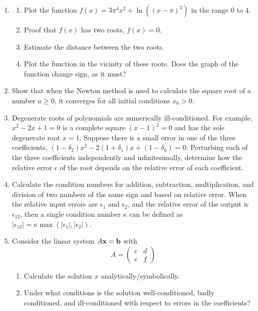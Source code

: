 \documentclass{article}
\begin{document}
\begin{enumerate}
\item \label{prbl:invisibleroot}
\begin{enumerate} \setlength{\itemsep}{0pt}
\item Plot the function  $f(x) = 3 \pi^4 x^2+\ln((x-\pi)^2)$ in the range 0 to 4.   %
\item Proof that $f(x)$ has two roots, $f(x)=0$.
\item Estimate the distance between the two roots. 
\item Plot the function in the vicinity of these roots.  Does the graph of the function change sign, as it must?
\end{enumerate}

\item Show that when the Newton method is used to calculate the square root of a number $a \geq 0$, it converges for all initial conditions $x_0 > 0$. 

\item
Degenerate roots of polynomials are numerically ill-conditioned.
For example, $x^2-2x+1=0$ is a complete square $(x-1)^2=0$ and has the sole degenerate root $x=1$.  
Suppose there is a small error in one of the three coefficients, $(1-\delta_2) x^2-2(1+\delta_1) x+(1-\delta_0)=0$.
Perturbing each of the three coefficients independently and infinitesimally, determine how the relative error $\epsilon$ of the root depends on the relative error of each coefficient. 

\item \label{prbl:cond4elemop}
  Calculate the condition numbers for addition, subtraction, multiplication, and division of two numbers of the same sign and based on relative error. When the relative input errors are $\epsilon_1$ and $\epsilon_2$, and the relative error of the output is $\epsilon_{12}$, then a single condition number $\kappa$ can be defined as $|\epsilon_{12}| = \kappa \max(|\epsilon_1|,|\epsilon_2|)$.

\item Consider the linear system $A{\bf x} = \bf b$ with
  \[
  A = \left( \begin{array}{cc} c & d \\
    e & f \end{array} \right)
  \]
    \begin{enumerate} \setlength{\itemsep}{0pt}
    \item Calculate the solution $x$ analytically/symbolically.
    \item Under what conditions is the solution well-conditioned, badly conditioned, and ill-conditioned
      with respect to errors in the coefficients?
    \end{enumerate}
  
\end{enumerate}
\end{document}
